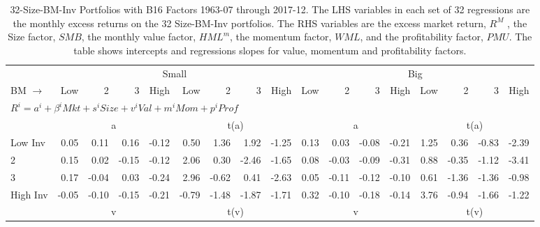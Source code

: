 
\begin{table}[!ht]
\footnotesize
\centering
\caption{
\scriptsize{
32-Size-BM-Inv Portfolios with B16 Factors 1963-07 through 2017-12.
The LHS variables in each set of 32 regressions are the monthly excess returns on the 32
Size-BM-Inv portfolios. The RHS variables are the excess market return, $R^M$ , the Size
factor, $SMB$, the monthly value factor, $HML^m$, the momentum factor, $WML$, and the
profitability factor, $PMU$. The table shows intercepts and regressions slopes for value,
momentum and profitability factors.
}
}
\begin{tabular}{lrrrrrrrrrrrrrrrr}
  \toprule
    & \multicolumn{8}{c}{Small} & \multicolumn{8}{c}{Big} \\
      \cmidrule(r){2-9} \cmidrule(r){10-17}
    BM $\rightarrow$ & Low & 2 & 3 & High & Low & 2 & 3 & High & Low & 2 & 3 & High & Low & 2 & 3 & High \\ 
  \midrule
  \multicolumn{17}{l}{$R^i=a^i+\beta^iMkt+s^iSize+v^iVal+m^iMom+p^iProf$} \\

  
    
      & \multicolumn{4}{c}{a} & \multicolumn{4}{c}{t(a)}
    
      & \multicolumn{4}{c}{a} & \multicolumn{4}{c}{t(a)}
    
    \\
      \cmidrule(r){2-5} \cmidrule(r){6-9} \cmidrule(r){10-13} \cmidrule(r){14-17}

    Low Inv   & 0.05  & 0.11  & 0.16  & -0.12  & 0.50  & 1.36  & 1.92  & -1.25  & 0.13  & 0.03  & -0.08  & -0.21  & 1.25  & 0.36  & -0.83  & -2.39  \\
           2  & 0.15  & 0.02  & -0.15  & -0.12  & 2.06  & 0.30  & -2.46  & -1.65  & 0.08  & -0.03  & -0.09  & -0.31  & 0.88  & -0.35  & -1.12  & -3.41  \\
           3  & 0.17  & -0.04  & 0.03  & -0.24  & 2.96  & -0.62  & 0.41  & -2.63  & 0.05  & -0.11  & -0.12  & -0.10  & 0.61  & -1.36  & -1.36  & -0.98  \\
    High Inv  & -0.05  & -0.10  & -0.15  & -0.21  & -0.79  & -1.48  & -1.87  & -1.71  & 0.32  & -0.10  & -0.18  & -0.14  & 3.76  & -0.94  & -1.66  & -1.22  \\

  
    
      & \multicolumn{4}{c}{v} & \multicolumn{4}{c}{t(v)}
    
      & \multicolumn{4}{c}{v} & \multicolumn{4}{c}{t(v)}
    

\end{tabular}
\end{table}
